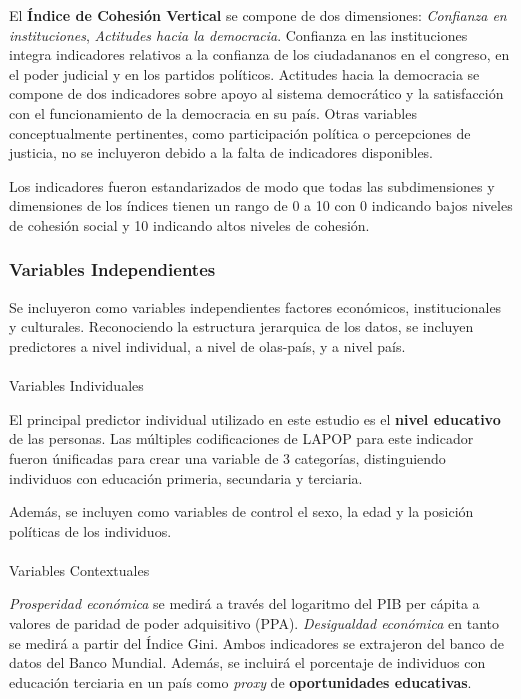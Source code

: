 \documentclass[
  spanish,
  letterpaper,
  DIV=11,
  numbers=noendperiod]{scrartcl}
\makeatletter
\let\oldparagraph\paragraph
\renewcommand{\paragraph}{
    \@ifstar
      \xxxParagraphStar
      \xxxParagraphNoStar
  }
\newcommand{\xxxParagraphStar}[1]{\oldparagraph*{#1}\mbox{}}
\newcommand{\xxxParagraphNoStar}[1]{\oldparagraph{#1}\mbox{}}
\makeatother
\begin{document}
El \textbf{Índice de Cohesión Vertical} se compone de dos dimensiones:
\emph{Confianza en instituciones}, \emph{Actitudes hacia la democracia}.
Confianza en las instituciones integra indicadores relativos a la
confianza de los ciudadananos en el congreso, en el poder judicial y en
los partidos políticos. Actitudes hacia la democracia se compone de dos
indicadores sobre apoyo al sistema democrático y la satisfacción con el
funcionamiento de la democracia en su país. Otras variables
conceptualmente pertinentes, como participación política o percepciones
de justicia, no se incluyeron debido a la falta de indicadores
disponibles.

Los indicadores fueron estandarizados de modo que todas las
subdimensiones y dimensiones de los índices tienen un rango de 0 a 10
con 0 indicando bajos niveles de cohesión social y 10 indicando altos
niveles de cohesión.

\subsubsection{Variables Independientes}\label{variables-independientes}

Se incluyeron como variables independientes factores económicos,
institucionales y culturales. Reconociendo la estructura jerarquica de
los datos, se incluyen predictores a nivel individual, a nivel de
olas-país, y a nivel país.

\paragraph{Variables Individuales}\label{variables-individuales}

El principal predictor individual utilizado en este estudio es el
\textbf{nivel educativo} de las personas. Las múltiples codificaciones
de LAPOP para este indicador fueron únificadas para crear una variable
de 3 categorías, distinguiendo individuos con educación primeria,
secundaria y terciaria.

Además, se incluyen como variables de control el sexo, la edad y la
posición políticas de los individuos.

\paragraph{Variables Contextuales}\label{variables-contextuales}

\emph{Prosperidad económica} se medirá a través del logaritmo del PIB
per cápita a valores de paridad de poder adquisitivo (PPA).
\emph{Desigualdad económica} en tanto se medirá a partir del Índice
Gini. Ambos indicadores se extrajeron del banco de datos del Banco
Mundial. Además, se incluirá el porcentaje de individuos con educación
terciaria en un país como \emph{proxy} de \textbf{oportunidades
educativas}.
\end{document}
